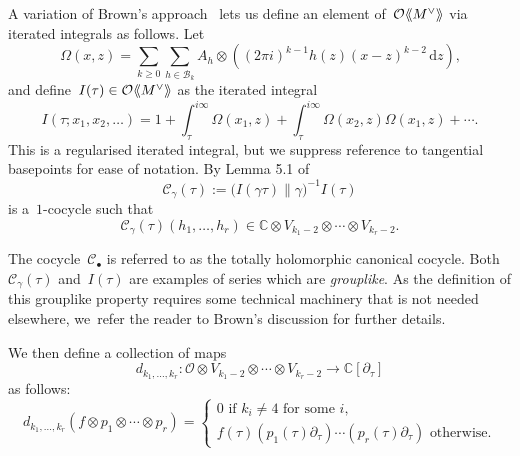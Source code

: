 \documentclass[JEP,XML,SOM,Unicode,published]{cedram}
\let\oldbullet\bullet
\renewcommand{\bullet}{{\scriptscriptstyle\oldbullet}}
\theoremstyle{plain}
\theoremstyle{definition}
\newcommand{\tx}{\text}
\newcommand{\bbC}{\ensuremath{\mathbb{C}}}
\newcommand{\cB}{\ensuremath{\mathcal{B}}}
\newcommand{\cC}{\ensuremath{\mathcal{C}}}
\newcommand{\cO}{\ensuremath{\mathcal{O}}}
\newcommand{\rmd}{\ensuremath{\mathrm{d}}}
\newcommand{\defeq}{:=}
\let\ga\gamma
\newcommand{\llangle}{\mathopen{\langle\mspace{-4mu}\langle}}
\newcommand{\rrangle}{\mathclose{\rangle\mspace{-4mu}\rangle}}
\newcommand{\dz}{\rmd z}
\begin{document}
A variation of Brown's approach~\cite{brown17} lets us define an element of~$\cO\llangle M^{\vee}\rrangle$ via iterated integrals as follows. Let
\begin{equation*}
\Omega(x,z)
=
\sum_{k\geq 0}\sum_{h\in\cB_k} A_h \otimes \left((2\pi i)^{k-1}h(z) (x - z)^{k-2} \,\dz\right)
\tx{,}
\end{equation*}
and define~$I(\tau)\in\cO\llangle M^{\vee}\rrangle$ as the iterated integral
\begin{equation*}
I(\tau;x_1,x_2,\ldots)
=
1 + \int_\tau^{i\infty} \Omega(x_1,z) + \int_{\tau}^{i\infty}\Omega(x_2,z)\Omega(x_1,z) + \cdots
\tx{.}
\end{equation*}
This is a regularised iterated integral, but we suppress reference to tangential basepoints \cite{brown17}for ease of notation. By Lemma 5.1 of~\cite{brown17}
\begin{equation}
\label{eq:def:canonical_cocycle}
\cC_\ga(\tau)
\defeq
\bigl(I(\ga\tau) \big\|\ga \bigr)^{-1} I(\tau)
\end{equation}
is a~$1$-cocycle such that
\begin{equation*}
\cC_\ga(\tau)(h_1,\ldots,h_r) \in \bbC\otimes V_{k_1-2}\otimes\cdots \otimes V_{k_r-2}
\tx{.}
\end{equation*}

The cocycle~$\cC_\bullet$ is referred to as the totally holomorphic canonical cocycle. Both~$\cC_\ga(\tau)$ and~$I(\tau)$ are examples of series which are \textit{grouplike}. As the definition of this grouplike property requires some technical machinery that is not needed elsewhere, we~refer the reader to Brown's discussion for further details.

We then define a collection of maps
\begin{equation*}d_{k_1,\ldots,k_r}:\cO\otimes V_{k_1-2}\otimes\cdots \otimes V_{k_r-2}\to \bbC[\partial_\tau]\end{equation*}
as follows:
\begin{equation*}
d_{k_1,\ldots,k_r}(f\otimes p_1\otimes\cdots\otimes p_r) = \begin{cases} 0 \text{ if } k_i\neq 4\text{ for some }i,\\
f(\tau)\left(p_1(\tau)\partial_\tau \right)\cdots \left(p_r(\tau)\partial_\tau\right)\text{ otherwise.}\end{cases}\end{equation*}
\end{document}
